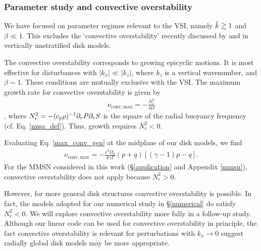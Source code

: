 \subsubsection{Parameter study and convective overstability}
We have focused on parameter regimes relevant to the VSI,
namely $\hat{k}\gtrsim 1$ and $\beta\ll 1$. This excludes the
`convective overstability' recently discussed by \cite{klahr14} and
\cite{lyra14} in vertically unstratified disk models. 

The convective overstability corresponds to growing epicyclic motions.
It is most effective for disturbances with $|k_x|\ll |k_z|$, where
$k_z$ is a vertical wavenumber, and $\beta\sim 1$. These conditions
are mutually exclusive with the VSI. 
The maximum growth 
rate for convective overstability is given by 
\begin{align}
  \nu_\mathrm{conv,max} = -\frac{N^2_r}{4\Omega}\label{max_conv_gen}
\end{align}
\citep{lyra14}, where $N_r^2 = -(c_p\rho)^{-1}\partial_rP\partial_rS$ is the
square of the radial buoyancy frequency
(cf. Eq. \ref{nzsq_def}). Thus, growth requires $N_r^2<0$.  

Evaluating Eq. \ref{max_conv_gen} at the midplane of our disk models,
we find  
\begin{align}
  \nu_\mathrm{conv,max} =
  -\frac{\epsilon^2\Omega_k}{4\gamma\Gamma}\left(p+q\right)
  \left[\left(\gamma-1\right)p-q\right]. \label{max_conv}
\end{align}
For the MMSN considered in this work (\S\ref{application} and Appendix
\ref{mmsn}), convective overstability does not apply because
$N_r^2>0$.   

However, for more general disk structures convective overstability is
possible. In fact, the models adopted for our numerical study in
\S\ref{numerical} do satisfy $N_r^2<0$. %
We will explore convective overstability more fully in a follow-up
study.  Although our linear code can be used for convective
overstability in principle, the fact convective overstability is
relevant for perturbations with $k_x\to0$ suggest radially global disk
models may be more appropriate.  


